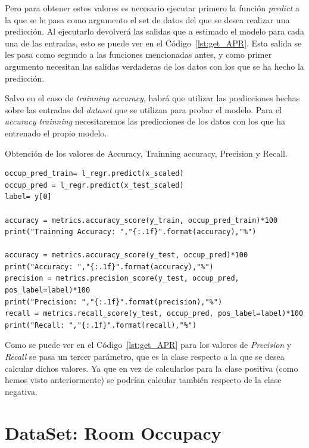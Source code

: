 \documentclass[a4paper, 12pt]{book}
\begin{document}
Pero para obtener estos valores es necesario ejecutar primero la función \textit{predict} a la que se le pasa como argumento el set de datos del que se desea realizar una predicción. Al ejecutarlo devolverá las salidas que a estimado el modelo para cada una de las entradas, esto se puede ver en el Código~\ref{lst:get_APR}. Esta salida se les pasa como segundo a las funciones mencionadas antes, y como primer argumento necesitan las salidas verdaderas de los datos con los que se ha hecho la predicción. 

Salvo en el caso de \textit{trainning accuracy}, habrá que utilizar las predicciones hechas sobre las entradas del \textit{dataset} que se utilizan para probar el modelo. Para el \textit{accuracy trainning} necesitaremos las predicciones de los datos con los que ha entrenado el propio modelo.

\begin{listing}[]
    \caption{Obtención de los valores de Accuracy, Trainning accuracy, Precision y Recall.}{}
    \label{lst:get_APR}
    \begin{verbatim}
occup_pred_train= l_regr.predict(x_scaled)
occup_pred = l_regr.predict(x_test_scaled)    
label= y[0]

accuracy = metrics.accuracy_score(y_train, occup_pred_train)*100
print("Trainning Accuracy: ","{:.1f}".format(accuracy),"%")

accuracy = metrics.accuracy_score(y_test, occup_pred)*100
print("Accuracy: ","{:.1f}".format(accuracy),"%")
precision = metrics.precision_score(y_test, occup_pred, pos_label=label)*100
print("Precision: ","{:.1f}".format(precision),"%")
recall = metrics.recall_score(y_test, occup_pred, pos_label=label)*100
print("Recall: ","{:.1f}".format(recall),"%")
    \end{verbatim}
\end{listing}

Como se puede ver en el Código~\ref{lst:get_APR} para los valores de \textit{Precision} y \textit{Recall} se pasa un tercer parámetro, que es la clase respecto a la que se desea calcular dichos valores. Ya que en vez de calcularlos para la clase positiva (como hemos visto anteriormente) se podrían calcular también respecto de la clase negativa.

\section{DataSet: Room Occupacy}
\label{sec:dataSet_Occupancy}
\end{document}
